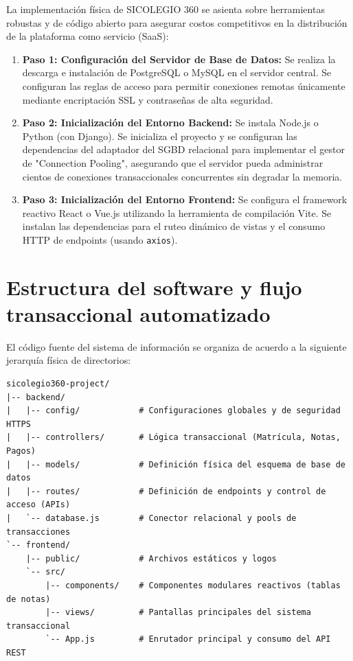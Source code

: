 \documentclass[12pt,a4paper,oneside]{report}
\begin{document}
La implementación física de SICOLEGIO 360 se asienta sobre herramientas robustas y de código abierto para asegurar costos competitivos en la distribución de la plataforma como servicio (SaaS):
\begin{enumerate}
    \item \textbf{Paso 1: Configuración del Servidor de Base de Datos:} Se realiza la descarga e instalación de PostgreSQL o MySQL en el servidor central. Se configuran las reglas de acceso para permitir conexiones remotas únicamente mediante encriptación SSL y contraseñas de alta seguridad.
    \item \textbf{Paso 2: Inicialización del Entorno Backend:} Se instala Node.js o Python (con Django). Se inicializa el proyecto y se configuran las dependencias del adaptador del SGBD relacional para implementar el gestor de "Connection Pooling", asegurando que el servidor pueda administrar cientos de conexiones transaccionales concurrentes sin degradar la memoria.
    \item \textbf{Paso 3: Inicialización del Entorno Frontend:} Se configura el framework reactivo React o Vue.js utilizando la herramienta de compilación Vite. Se instalan las dependencias para el ruteo dinámico de vistas y el consumo HTTP de endpoints (usando \texttt{axios}).
\end{enumerate}

\section{Estructura del software y flujo transaccional automatizado}

El código fuente del sistema de información se organiza de acuerdo a la siguiente jerarquía física de directorios:
\begin{verbatim}
sicolegio360-project/
|-- backend/
|   |-- config/            # Configuraciones globales y de seguridad HTTPS
|   |-- controllers/       # Lógica transaccional (Matrícula, Notas, Pagos)
|   |-- models/            # Definición física del esquema de base de datos
|   |-- routes/            # Definición de endpoints y control de acceso (APIs)
|   `-- database.js        # Conector relacional y pools de transacciones
`-- frontend/
    |-- public/            # Archivos estáticos y logos
    `-- src/
        |-- components/    # Componentes modulares reactivos (tablas de notas)
        |-- views/         # Pantallas principales del sistema transaccional
        `-- App.js         # Enrutador principal y consumo del API REST
\end{verbatim}
\end{document}
